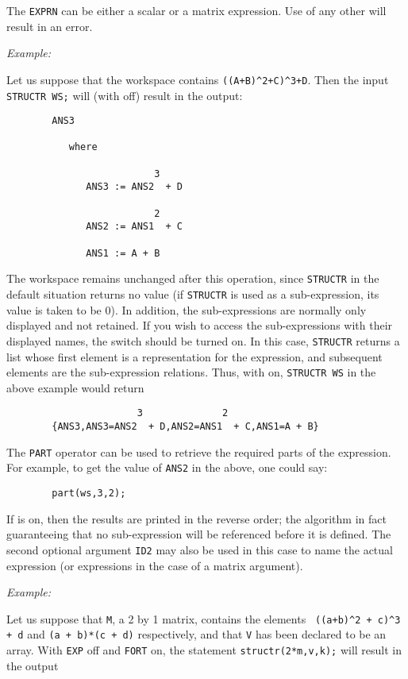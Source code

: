 The \texttt{EXPRN} can be either a scalar or a matrix expression.  Use of any
other will result in an error.

\textit{Example:}

Let us suppose that the workspace contains
\texttt{((A+B)\textasciicircum2+C)\textasciicircum3+D}.
Then the input \texttt{STRUCTR WS;} will (with  off) result in the
output:
\begin{verbatim}
        ANS3

           where

                          3
              ANS3 := ANS2  + D

                          2
              ANS2 := ANS1  + C

              ANS1 := A + B
\end{verbatim}
\hypertarget{switch:SAVESTRUCTR}{}
The workspace remains unchanged after this operation, since \texttt{STRUCTR}
 in the default situation returns
no value (if \texttt{STRUCTR} is used as a sub-expression, its value is taken
to be 0).  In addition, the sub-expressions are normally only displayed
and not retained. If you wish to access the sub-expressions with their
displayed names, the switch  should be
turned on.  In this case, \texttt{STRUCTR} returns a list whose first element
is a representation for the expression, and subsequent elements are the
sub-expression relations.  Thus, with  on, \texttt{STRUCTR WS}
in the above example would return
\vspace{-11pt}
\begin{verbatim}
                       3              2
        {ANS3,ANS3=ANS2  + D,ANS2=ANS1  + C,ANS1=A + B}
\end{verbatim}
The \texttt{PART} operator can
be used to retrieve the required parts of the expression.  For example, to
get the value of \texttt{ANS2} in the above, one could say:
\begin{verbatim}
        part(ws,3,2);
\end{verbatim}
If  is on, then the results are printed in the reverse order; the
algorithm in fact guaranteeing that no sub-expression will be referenced
before it is defined.  The second optional argument \texttt{ID2} may also be
used in this case to name the actual expression (or expressions in the
case of a matrix argument).

\textit{Example:}

Let us suppose that \texttt{M}, a 2 by 1 matrix, contains the elements {\tt
((a+b)\verb|^|2 + c)\verb|^|3 + d} and \texttt{(a + b)*(c + d)} respectively,
and that \texttt{V} has been declared to be an array.  With \texttt{EXP} off and
\texttt{FORT} on, the statement \texttt{structr(2*m,v,k);} will result in the output

